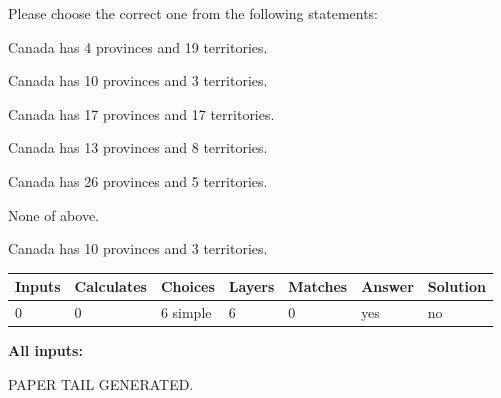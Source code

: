 \documentclass[12pt]{article}
\begin{document}
  
Please choose the correct one from the following statements:
 
 
Canada has   4 provinces and  19 territories.
 
 
Canada has 10  provinces and 3 territories.
 
 
Canada has  17 provinces and  17 territories.
 
 
Canada has  13 provinces and  8 territories.
 
 
Canada has  26 provinces and  5 territories.
 
 
 None of above.
 
 
\noindent{}
 
 
Canada has 10  provinces and 3 territories.
 
 
\noindent{}
 
 
   
   
   
   
\noindent\begin{tabular}{|l|l|l|l|l|l|l|}
 \hline
Inputs & Calculates & Choices & Layers & Matches & Answer & Solution \\ \hline
 0  & 
 0  & 
 6
  simple  
  & 
 6  & 
 0  & 
  yes & 
  no 
  \\ \hline
 \end{tabular}
   
   
   
   
\noindent{}
   
   
   
   
\noindent\vspace{0.1in}\hspace{-0.08in} {\textbf{\Large{All inputs: }}}
   
   
   
   
   
   
 \vspace{0.2in}
 
   
   
\vspace{2.0in} PAPER TAIL GENERATED.
   
   
   
\end{document}
